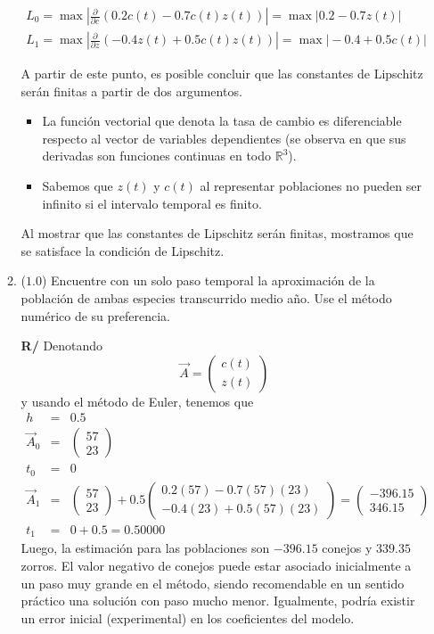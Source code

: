 \documentclass[12pt]{article}
\newcommand{\R}{\ensuremath{\mathbb{R}}}
\newcommand{\pdiff}[3]{\frac{\partial^{#3} #1}{\partial#2^{#3}}}
\begin{document}
\begin{enumerate}[leftmargin=*,widest=9]
\begin{enumerate}[label=\alph*]
    \begin{eqnarray*}
    L_0 = \max \left\vert \pdiff{}{c}{} (0.2 c(t) - 0.7 c(t) z(t)) \right\vert = \max \vert 0.2 - 0.7 z(t)\vert \\
    L_1 = \max \left\vert \pdiff{}{z}{} (-0.4 z(t) + 0.5 c(t) z(t)) \right\vert = \max \vert -0.4 + 0.5 c(t) \vert
    \end{eqnarray*}

    A partir de este punto, es posible concluir que las constantes de Lipschitz serán finitas a partir de dos argumentos.

    \begin{itemize}
\item La función vectorial que denota la tasa de cambio es diferenciable respecto al vector de variables dependientes (se observa en que sus derivadas son funciones continuas en todo \(\R^3\)).
\item Sabemos que \(z(t)\) y \(c(t)\) al representar poblaciones no pueden ser infinito si el intervalo temporal es finito.
    \end{itemize}

    Al mostrar que las constantes de Lipschitz serán finitas, mostramos que se satisface la condición de Lipschitz.

    \item (\(1.0\)) Encuentre con un solo paso temporal la aproximación de la población de ambas especies transcurrido medio año. Use el método numérico de su preferencia.

    \textbf{R/}
Denotando
\[
\vec{A} = \begin{pmatrix}c(t)\\z(t)\end{pmatrix}
\]
y usando el método de Euler, tenemos que
\begin{eqnarray*}
h &=& 0.5\\
\vec{A}_0 &=& \begin{pmatrix}57\\23\end{pmatrix}\\
t_0 &=& 0\\
\vec{A}_1 &=& \begin{pmatrix}57\\23\end{pmatrix} + 0.5\begin{pmatrix}0.2(57) - 0.7(57)(23)\\ -0.4(23)+0.5(57)(23)\end{pmatrix}=\begin{pmatrix}-396.15\\346.15\end{pmatrix}\\
t_1 &=& 0 + 0.5 = 0.50000
\end{eqnarray*}
Luego, la estimación para las poblaciones son \(-396.15\) conejos y \(339.35\) zorros. El valor negativo de conejos puede estar asociado inicialmente a un paso muy grande en el método, siendo recomendable en un sentido práctico una solución con paso mucho menor. Igualmente, podría existir un error inicial (experimental) en los coeficientes del modelo.
    \end{enumerate}

\end{enumerate}
\end{document}
